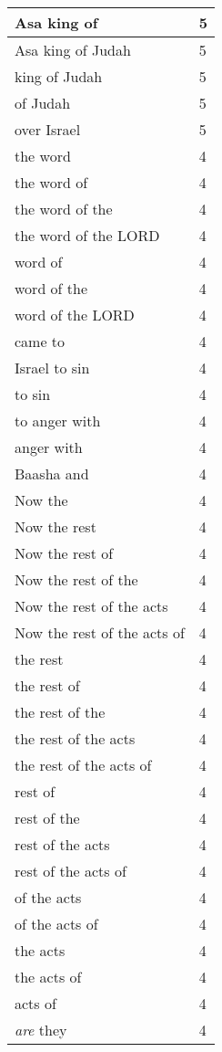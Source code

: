 \begin{center}
\begin{longtable}{|p{3.0in}|p{0.5in}|}
Asa king of & 5\\ \hline 
Asa king of Judah & 5\\ \hline 
king of Judah & 5\\ \hline 
of Judah & 5\\ \hline 
over Israel & 5\\ \hline 
the word & 4\\ \hline 
the word of & 4\\ \hline 
the word of the & 4\\ \hline 
the word of the LORD & 4\\ \hline 
word of & 4\\ \hline 
word of the & 4\\ \hline 
word of the LORD & 4\\ \hline 
came to & 4\\ \hline 
Israel to sin & 4\\ \hline 
to sin & 4\\ \hline 
to anger with & 4\\ \hline 
anger with & 4\\ \hline 
Baasha and & 4\\ \hline 
Now the & 4\\ \hline 
Now the rest & 4\\ \hline 
Now the rest of & 4\\ \hline 
Now the rest of the & 4\\ \hline 
Now the rest of the acts & 4\\ \hline 
Now the rest of the acts of & 4\\ \hline 
the rest & 4\\ \hline 
the rest of & 4\\ \hline 
the rest of the & 4\\ \hline 
the rest of the acts & 4\\ \hline 
the rest of the acts of & 4\\ \hline 
rest of & 4\\ \hline 
rest of the & 4\\ \hline 
rest of the acts & 4\\ \hline 
rest of the acts of & 4\\ \hline 
of the acts & 4\\ \hline 
of the acts of & 4\\ \hline 
the acts & 4\\ \hline 
the acts of & 4\\ \hline 
acts of & 4\\ \hline 
\emph{are} they & 4\\ \hline 

\end{longtable}
\end{center}
